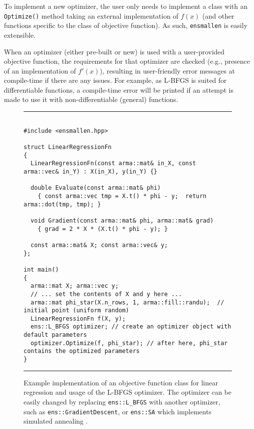 \documentclass[twoside,11pt]{article}
\begin{document}
To implement a new optimizer, the user only needs to implement a class with an
{\tt Optimize()} method taking an external implementation of $f(x)$ (and other
functions specific to the class of objective function).  As such, {\tt ensmallen}
is easily extensible.

When an optimizer (either pre-built or new) is used with a user-provided objective function,
the requirements for that optimizer are checked
(e.g., presence of an implementation of $f'(x)$),
resulting in user-friendly error messages at compile-time
if there are any issues.
For example, as L-BFGS is suited for differentiable functions,
a compile-time error will be printed if an attempt is made
to use it with non-differentiable (general) functions.

\begin{figure}[t!]
\hrule
\vspace{1ex}
\centering
\begin{verbatim}

#include <ensmallen.hpp>

struct LinearRegressionFn
{
  LinearRegressionFn(const arma::mat& in_X, const arma::vec& in_Y) : X(in_X), y(in_Y) {}

  double Evaluate(const arma::mat& phi)
    { const arma::vec tmp = X.t() * phi - y;  return arma::dot(tmp, tmp); }
  
  void Gradient(const arma::mat& phi, arma::mat& grad)
    { grad = 2 * X * (X.t() * phi - y); }

  const arma::mat& X; const arma::vec& y;
};

int main() 
{
  arma::mat X; arma::vec y;
  // ... set the contents of X and y here ...
  arma::mat phi_star(X.n_rows, 1, arma::fill::randu);  // initial point (uniform random)
  LinearRegressionFn f(X, y);
  ens::L_BFGS optimizer; // create an optimizer object with default parameters
  optimizer.Optimize(f, phi_star); // after here, phi_star contains the optimized parameters
}
\end{verbatim}
\hrule
\vspace*{-0.5em}
\caption{Example implementation of an objective function class for linear
regression and usage of the L-BFGS optimizer.
The optimizer can be easily changed by replacing
{\tt ens::L\_BFGS} with another optimizer,
such as {\tt ens::GradientDescent},
or {\tt ens::SA} which implements simulated annealing \citep{kirkpatrick1983optimization}.
}
\label{fig:lr_function}
\vspace*{-2em}
\end{figure}
\end{document}
